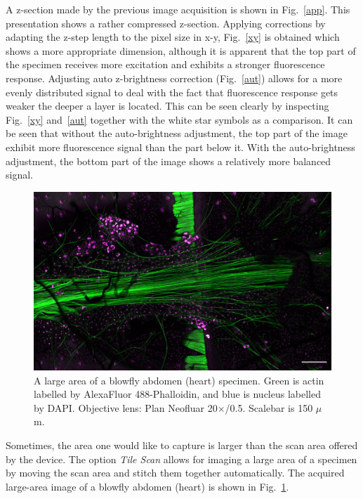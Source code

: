 A z-section made by the previous image acquisition is shown in Fig.~\ref{app}. 
This presentation shows a rather compressed z-section. 
Applying corrections by adapting the z-step length to the pixel size in x-y, Fig.~\ref{xy} is obtained which shows a more appropriate dimension, although it is apparent that the top part of the specimen receives more excitation and exhibits a stronger fluorescence response. 
Adjusting auto z-brightness correction (Fig.~\ref{aut}) allows for a more evenly distributed signal to deal with the fact that fluorescence response gets weaker the deeper a layer is located. 
This can be seen clearly by inspecting Fig.~\ref{xy} and~\ref{aut} together with the white star symbols as a comparison. It can be seen that without the auto-brightness adjustment, the top part of the image exhibit more fluorescence signal than the part below it. With the auto-brightness adjustment, the bottom part of the image shows a relatively more balanced signal.

\begin{figure}[h!]
\centering
\includegraphics[width=0.7\columnwidth]{Exp_3_LSM/Figures/MS3/F5mg_150um}	
\caption{ A large area of a blowfly abdomen (heart) specimen. 
Green is actin labelled by AlexaFluor 488-Phalloidin, and blue is nucleus labelled by DAPI. 
Objective lens: Plan Neofluar 20$\times$/0.5. 
Scalebar is 150 $\mu$m.}
\label{fig:bloabdo}
\end{figure}

Sometimes, the area one would like to capture is larger than the scan area offered by the device. 
The option \textit{Tile Scan} allows for imaging a large area of a specimen by moving the scan area and stitch them together automatically. 
The acquired large-area image of a blowfly abdomen (heart) is shown in Fig.~\ref{fig:bloabdo}.

